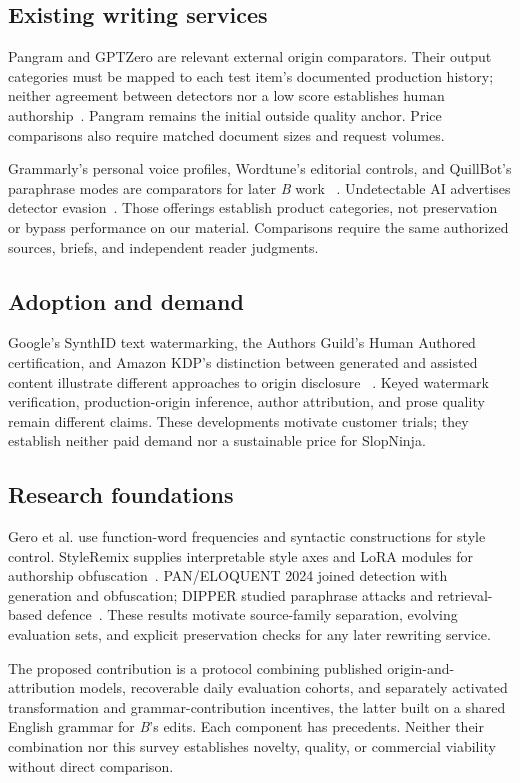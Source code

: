 \subsection{Existing writing services}\label{related-services}

Pangram and GPTZero are relevant external origin comparators. Their output
categories must be mapped to each test item's documented production history;
neither agreement between detectors nor a low score establishes human
authorship~\cite{pangramcard,gptzero}. Pangram remains the initial outside
quality anchor. Price comparisons also require matched document sizes and
request volumes.

Grammarly's personal voice profiles, Wordtune's editorial controls, and
QuillBot's paraphrase modes are comparators for later \textit{B} work
~\cite{grammarlyvoice,wordtune,quillbot}. Undetectable AI advertises detector
evasion~\cite{undetectable}. Those offerings establish product categories,
not preservation or bypass performance on our material. Comparisons require
the same authorized sources, briefs, and independent reader judgments.

\subsection{Adoption and demand}\label{adoption-and-demand}

Google's SynthID text watermarking, the Authors Guild's Human Authored
certification, and Amazon KDP's distinction between generated and assisted
content illustrate different approaches to origin disclosure
~\cite{synthidtext,authorsguildhuman,amazonkdp}. Keyed watermark verification,
production-origin inference, author attribution, and prose quality remain
different claims. These developments motivate customer trials; they establish
neither paid demand nor a sustainable price for SlopNinja.

\subsection{Research foundations}\label{related-research}

Gero et al. use function-word frequencies and syntactic constructions for
style control. StyleRemix supplies interpretable style axes and LoRA modules
for authorship obfuscation~\cite{linguisticcontrols,styleremix}. PAN/ELOQUENT
2024 joined detection with generation and obfuscation; DIPPER studied
paraphrase attacks and retrieval-based defence~\cite{pan2024,dipper}.
These results motivate source-family separation, evolving evaluation sets,
and explicit preservation checks for any later rewriting service.

The proposed contribution is a protocol combining published
origin-and-attribution models, recoverable daily evaluation cohorts, and
separately activated transformation and grammar-contribution incentives, the
latter built on a shared English grammar for \textit{B}'s edits. Each component has
precedents. Neither their combination nor this survey establishes novelty,
quality, or commercial viability without direct comparison.
